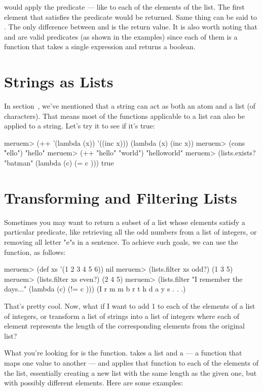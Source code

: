  would apply the predicate --- like  to each of the elements of the list. The first element that satisfies the predicate would be returned. Same thing can be said to . The only difference between  and  is the return value. It is also worth noting that  and  are valid predicates (as shown in the examples) since each of them is a function that takes a single expression and returns a boolean. 

\section{Strings as Lists}
In section~, we've mentioned that a string can act as both an atom and a list (of characters). That means most of the functions applicable to a list can also be applied to a string. Let's try it to see if it's true:

\begin{REPL}
meruem> (++ '(lambda (x)) '((inc x)))
(lambda (x) (inc x))
meruem> (cons \h "ello")
"hello"
meruem> (++ "hello" "world")
"helloworld"
meruem> (lists.exists? "batman" (lambda (c) (= c \a)))
true
\end{REPL}

\section{Transforming and Filtering Lists}
Sometimes you may want to return a subset of a list whose elements satisfy a particular predicate, like retrieving all the odd numbers from a list of integers, or removing all letter "e"s in a sentence. To achieve such goals, we can use the  function, as follows:

\begin{REPL}
meruem> (def xs '(1 2 3 4 5 6))
nil
meruem> (lists.filter xs odd?) 
(1 3 5)
meruem> (lists.filter xs even?)
(2 4 5)
meruem> (lists.filter "I remember the days..." (lambda (c) (!= c \e)))
(I   r m m b r   t h   d a y s . . .)
\end{REPL}

That's pretty cool. Now, what if I want to add 1 to each of the elements of a list of integers, or transform a list of strings into a list of integers where each of element represents the length of the corresponding elements from the original list?

What you're looking for is the  function.  takes a list and a  --- a function that maps one value to another --- and applies that function to each of the elements of the list, essentially creating a new list with the same length as the given one, but with possibly different elements. Here are some examples:

